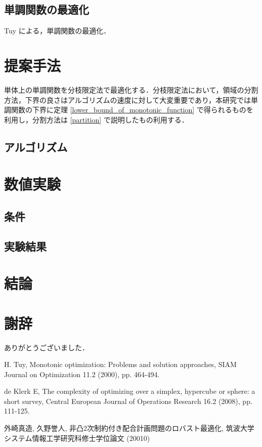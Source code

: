 \documentclass[a4paper,11pt]{jreport}
\begin{document}
\section{単調関数の最適化}

Tuy による，単調関数の最適化．

\chapter{提案手法}

単体上の単調関数を分枝限定法で最適化する．分枝限定法において，領域の分割方法，下界の良さはアルゴリズムの速度に対して大変重要であり，本研究では単調関数の下界に定理  \ref{lower_bound_of_monotonic_function} で得られるものを利用し，分割方法は \ref{partition} で説明したもの利用する．

\section{アルゴリズム}



\chapter{数値実験}
\section{条件}
\section{実験結果}

\chapter{結論}

\chapter*{謝辞}

ありがとうございました．

\newpage

\renewcommand{\bibname}{参考文献}

\begin{thebibliography}{1}

H. Tuy,
\newblock Monotonic optimization: Problems and solution approaches,
\newblock SIAM Journal on Optimization 11.2 (2000), pp. 464-494.

de Klerk E,
\newblock The complexity of optimizing over a simplex, hypercube or sphere: a short survey,
\newblock Central European Journal of Operations Research 16.2 (2008), pp. 111-125.

外崎真造, 久野誉人,
\newblock 非凸2次制約付き配合計画問題のロバスト最適化,
\newblock 筑波大学システム情報工学研究科修士学位論文 (20010)
\end{thebibliography}
\end{document}
